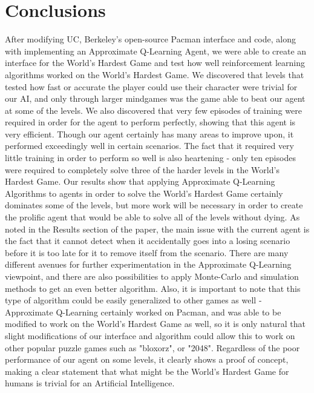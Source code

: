 \documentclass[11pt]{article}
\begin{document}
\section{Conclusions}

After modifying UC, Berkeley's open-source Pacman interface and code, along with implementing an Approximate Q-Learning Agent, we were able to create an interface for the World's Hardest Game and test how well reinforcement learning algorithms worked on the World's Hardest Game. We discovered that levels that tested how fast or accurate the player could use their character were trivial for our AI, and only through larger mindgames was the game able to beat our agent at some of the levels. We also discovered that very few episodes of training were required in order for the agent to perform perfectly, showing that this agent is very efficient. Though our agent certainly has many areas to improve upon, it performed exceedingly well in certain scenarios. The fact that it required very little training in order to perform so well is also heartening - only ten episodes were required to completely solve three of the harder levels in the World's Hardest Game. Our results show that applying Approximate Q-Learning Algorithms to agents in order to solve the World's Hardest Game certainly dominates some of the levels, but more work will be necessary in order to create the prolific agent that would be able to solve all of the levels without dying. As noted in the Results section of the paper, the main issue with the current agent is the fact that it cannot detect when it accidentally goes into a losing scenario before it is too late for it to remove itself from the scenario. There are many different avenues for further experimentation in the Approximate Q-Learning viewpoint, and there are also possibilities to apply Monte-Carlo and simulation methods to get an even better algorithm. Also, it is important to note that this type of algorithm could be easily generalized to other games as well - Approximate Q-Learning certainly worked on Pacman, and was able to be modified to work on the World's Hardest Game as well, so it is only natural that slight modifications of our interface and algorithm could allow this to work on other popular puzzle games such as "bloxorz", or "2048". Regardless of the poor performance of our agent on some levels, it clearly shows a proof of concept, making a clear statement that what might be the World's Hardest Game for humans is trivial for an Artificial Intelligence. 
\end{document}
